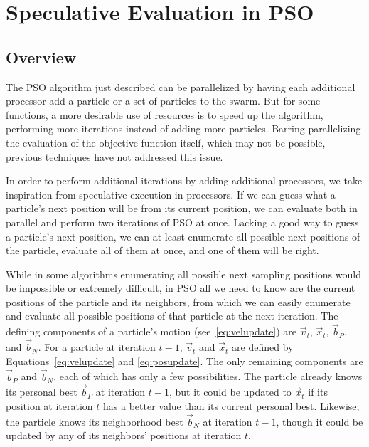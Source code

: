 \documentclass[oneside,honors]{honors}
\providecommand{\ppos}{\ensuremath{\Vec{x}}}
\providecommand{\pvel}{\ensuremath{\Vec{v}}}
\providecommand{\nbest}{\ensuremath{\Vec{b}_N}}
\providecommand{\pbest}{\ensuremath{\Vec{b}_P}}
\begin{document}
\section{Speculative Evaluation in PSO}
\label{sec:sepso}
\subsection{Overview}

The PSO algorithm just described can be parallelized by having each additional
processor add a particle or a set of particles to the swarm.  But for some
functions, a more desirable use of resources is to speed up the algorithm,
performing more iterations instead of adding more particles.  Barring
parallelizing the evaluation of the objective function itself, which may not be
possible, previous techniques have not addressed this issue.

In order to perform additional iterations by adding additional processors, we
take inspiration from speculative execution in processors.  If we can guess
what a particle's next position will be from its current position, we can
evaluate both in parallel and perform two iterations of PSO at once.  Lacking
a good way to guess a particle's next position, we can at least enumerate all
possible next positions of the particle, evaluate all of them at once, and one
of them will be right.

While in some algorithms enumerating all possible next sampling positions would
be impossible or extremely difficult, in PSO all we need to know are the
current positions of the particle and its neighbors, from which we can easily
enumerate and evaluate all possible positions of that particle at the next
iteration.  The defining components of a particle's motion
(see~\eqref{eq:velupdate}) are $\pvel_t$, $\ppos_t$, $\pbest$, and $\nbest$.
For a particle at iteration $t-1$, $\pvel_t$ and $\ppos_t$ are defined by
Equations~\eqref{eq:velupdate} and \eqref{eq:posupdate}.  The only remaining
components are $\pbest$ and $\nbest$, each of which has only a few
possibilities.  The particle already knows its personal best $\pbest$ at
iteration $t-1$, but it could be updated to $\ppos_t$ if its position at
iteration $t$ has a better value than its current personal best.  Likewise, the
particle knows its neighborhood best $\nbest$ at iteration $t-1$, though it
could be updated by any of its neighbors' positions at iteration $t$.
\end{document}
